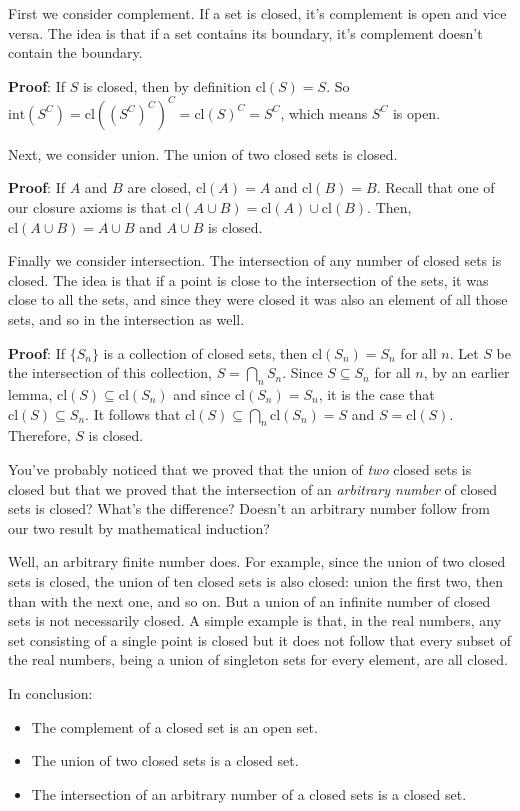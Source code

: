 \documentclass{report}
\newcommand{\cl}{\mathrm{cl}}
\newcommand{\intr}{\mathrm{int}}
\begin{document}
First we consider complement. If a set is closed, it's complement is open and vice versa. The idea is that if a set contains its boundary, it's complement doesn't contain the boundary.

{\bf Proof}: If $S$ is closed, then by definition $\cl(S) = S$. So $\intr(S^C) = \cl((S^C)^C)^C = \cl(S)^C = S^C$, which means $S^C$ is open.

Next, we consider union. The union of two closed sets is closed. 

{\bf Proof}: If $A$ and $B$ are closed, $\cl(A) = A$ and $\cl(B) = B$. Recall that one of our closure axioms is that $\cl(A∪B) = \cl(A)∪\cl(B)$. Then, $\cl(A∪B) = A∪B$ and $A∪B$ is closed.

Finally we consider intersection. The intersection of any number of closed sets is closed. The idea is that if a point is close to the intersection of the sets, it was close to all the sets, and since they were closed it was also an element of all those sets, and so in the intersection as well.

{\bf Proof}: If $\{S_n\}$ is a collection of closed sets, then $\cl(S_n) = S_n$ for all $n$. Let $S$ be the intersection of this collection, $S=\bigcap_n S_n$. Since $S ⊆ S_n$ for all $n$, by an earlier lemma, $\cl(S) ⊆ \cl(S_n)$ and since $\cl(S_n) = S_n$, it is the case that $\cl(S) ⊆ S_n$. It follows that $\cl(S) ⊆ \bigcap_n \cl(S_n) = S$ and $S = \cl(S)$. Therefore, $S$ is closed.

You've probably noticed that we proved that the union of \emph{two} closed sets is closed but that we proved that the intersection of an \emph{arbitrary number} of closed sets is closed? What's the difference? Doesn't an arbitrary number follow from our two result by mathematical induction?

Well, an arbitrary finite number does. For example, since the union of two closed sets is closed, the union of ten closed sets is also closed: union the first two, then than with the next one, and so on. But a union of an infinite number of closed sets is not necessarily closed. A simple example is that, in the real numbers, any set consisting of a single point is closed but it does not follow that every subset of the real numbers, being a union of singleton sets for every element, are all closed.

In conclusion:

\begin{itemize}
\item The complement of a closed set is an open set.
\item The union of two closed sets is a closed set.
\item The intersection of an arbitrary number of a closed sets is a closed set.
\end{itemize}
\end{document}
